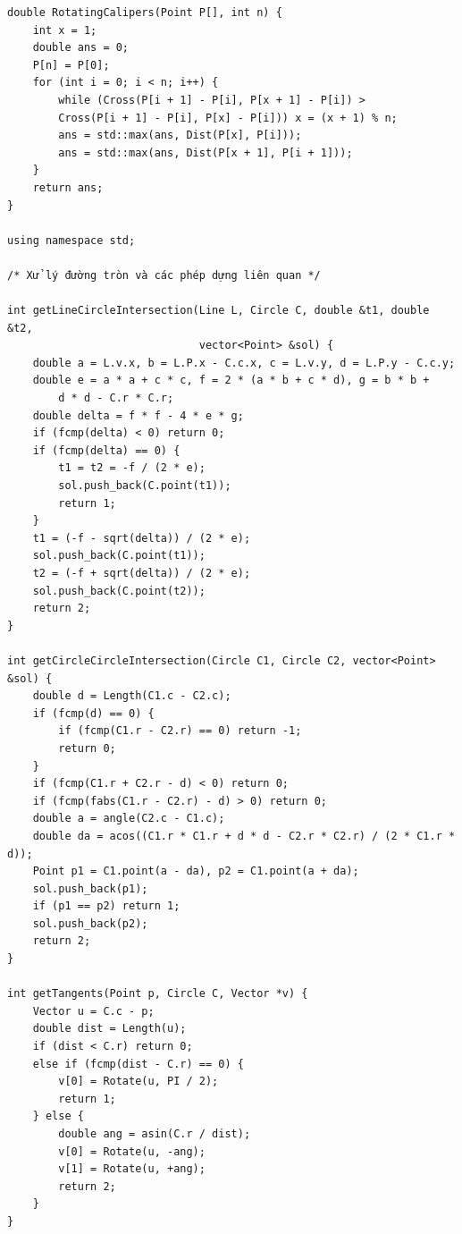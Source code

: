 \documentclass[11pt]{article}
\begin{document}
\begin{verbatim}
double RotatingCalipers(Point P[], int n) {
    int x = 1;
    double ans = 0;
    P[n] = P[0];
    for (int i = 0; i < n; i++) {
        while (Cross(P[i + 1] - P[i], P[x + 1] - P[i]) >
        Cross(P[i + 1] - P[i], P[x] - P[i])) x = (x + 1) % n;
        ans = std::max(ans, Dist(P[x], P[i]));
        ans = std::max(ans, Dist(P[x + 1], P[i + 1]));
    }
    return ans;
}

using namespace std;

/* Xử lý đường tròn và các phép dựng liên quan */

int getLineCircleIntersection(Line L, Circle C, double &t1, double &t2,
                              vector<Point> &sol) {
    double a = L.v.x, b = L.P.x - C.c.x, c = L.v.y, d = L.P.y - C.c.y;
    double e = a * a + c * c, f = 2 * (a * b + c * d), g = b * b +
        d * d - C.r * C.r;
    double delta = f * f - 4 * e * g;
    if (fcmp(delta) < 0) return 0;
    if (fcmp(delta) == 0) {
        t1 = t2 = -f / (2 * e);
        sol.push_back(C.point(t1));
        return 1;
    }
    t1 = (-f - sqrt(delta)) / (2 * e);
    sol.push_back(C.point(t1));
    t2 = (-f + sqrt(delta)) / (2 * e);
    sol.push_back(C.point(t2));
    return 2;
}

int getCircleCircleIntersection(Circle C1, Circle C2, vector<Point> &sol) {
    double d = Length(C1.c - C2.c);
    if (fcmp(d) == 0) {
        if (fcmp(C1.r - C2.r) == 0) return -1;
        return 0;
    }
    if (fcmp(C1.r + C2.r - d) < 0) return 0;
    if (fcmp(fabs(C1.r - C2.r) - d) > 0) return 0;
    double a = angle(C2.c - C1.c);
    double da = acos((C1.r * C1.r + d * d - C2.r * C2.r) / (2 * C1.r * d));
    Point p1 = C1.point(a - da), p2 = C1.point(a + da);
    sol.push_back(p1);
    if (p1 == p2) return 1;
    sol.push_back(p2);
    return 2;
}

int getTangents(Point p, Circle C, Vector *v) {
    Vector u = C.c - p;
    double dist = Length(u);
    if (dist < C.r) return 0;
    else if (fcmp(dist - C.r) == 0) {
        v[0] = Rotate(u, PI / 2);
        return 1;
    } else {
        double ang = asin(C.r / dist);
        v[0] = Rotate(u, -ang);
        v[1] = Rotate(u, +ang);
        return 2;
    }
}


\end{verbatim}
\end{document}

